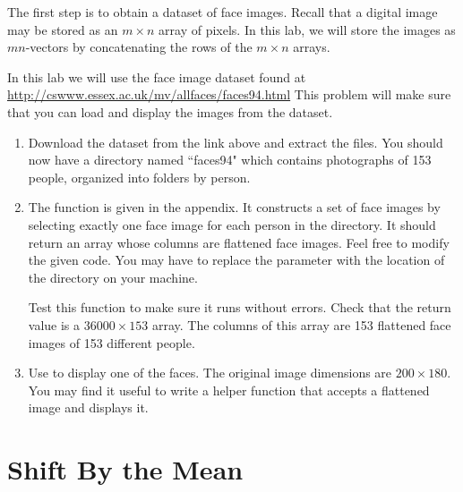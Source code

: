 The first step is to obtain a dataset of face images.
Recall that a digital image may be stored as an $m \times n$ array of pixels. 
In this lab, we will store the images as $mn$-vectors by concatenating the rows of the $m \times n$ arrays.

\begin{problem}
\label{prob:getTrainingFaces}
In this lab we will use the  face image dataset found at \url{http://cswww.essex.ac.uk/mv/allfaces/faces94.html} 
This problem will make sure that you can load and display the images from the dataset.
\begin{enumerate}
\item Download the  dataset from the link above and extract the files.
You should now have a directory named ``faces94" which contains photographs of 153 people, organized into folders by person.

\item The function  is given in the appendix. %
It constructs a set of face images by selecting exactly one face image for each person in the directory.
It should return an array whose columns are flattened face images.
Feel free to modify the given code.
You may have to replace the parameter  with the location of the directory  on your machine.

Test this function to make sure it runs without errors.
Check that the return value  is a $36000 \times 153$ array. 
The columns of this array are 153 flattened face images of 153 different people.

\item Use  to display one of the faces.
The original image dimensions are $200 \times 180$.
You may find it useful to write a helper function that accepts a flattened image and displays it.

\end{enumerate}
\end{problem}


\section*{Shift By the Mean}

